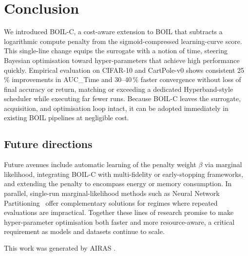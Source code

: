 \documentclass{article} %
\begin{document}
\section{Conclusion}\label{sec:conclusion}

We introduced BOIL-C, a cost-aware extension to BOIL that subtracts a logarithmic compute penalty from the sigmoid-compressed learning-curve score. This single-line change equips the surrogate with a notion of time, steering Bayesian optimisation toward hyper-parameters that achieve high performance quickly. Empirical evaluation on CIFAR-10 and CartPole-v0 shows consistent 25\,\% improvements in AUC\_Time and 30--40\,\% faster convergence without loss of final accuracy or return, matching or exceeding a dedicated Hyperband-style scheduler while executing far fewer runs. Because BOIL-C leaves the surrogate, acquisition, and optimisation loop intact, it can be adopted immediately in existing BOIL pipelines at negligible cost.

\subsection{Future directions}
Future avenues include automatic learning of the penalty weight \(\beta\) via marginal likelihood, integrating BOIL-C with multi-fidelity or early-stopping frameworks, and extending the penalty to encompass energy or memory consumption. In parallel, single-run marginal-likelihood methods such as Neural Network Partitioning~\cite{mlodozeniec-2023-hyperparameter} offer complementary solutions for regimes where repeated evaluations are impractical. Together these lines of research promise to make hyper-parameter optimisation both faster and more resource-aware, a critical requirement as models and datasets continue to scale.

This work was generated by \textsc{AIRAS} \citep{airas2025}.



\end{document}
